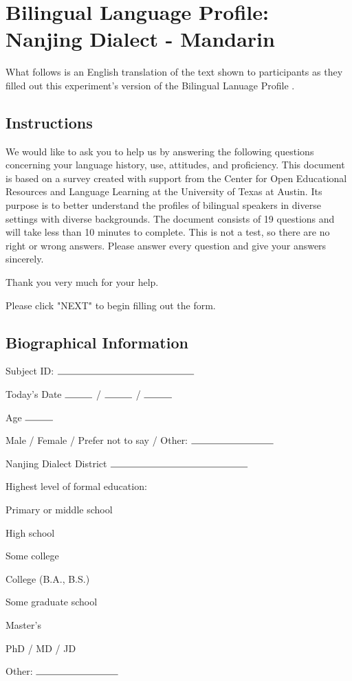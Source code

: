 \chapter{Bilingual Language Profile: Nanjing Dialect - Mandarin}	%
\label{appendix:BLP}

What follows is an English translation of the text shown to participants as they filled out this experiment's version of the Bilingual Lanuage Profile \citep{birdsong2012bilingual,gertken2014assessing}.

\section{Instructions}
	We would like to ask you to help us by answering the following questions concerning your language history, use, attitudes, and proficiency. This document is based on a survey created with support from the Center for Open Educational Resources and Language Learning at the University of Texas at Austin. Its purpose is to better understand the profiles of bilingual speakers in diverse settings with diverse backgrounds. The document consists of 19 questions and will take less than 10 minutes to complete. This is not a test, so there are no right or wrong answers. Please answer every question and give your answers sincerely.
	
	Thank you very much for your help.
	
	Please click "NEXT" to begin filling out the form.

\section{Biographical Information}
Subject ID: $\rule{5cm}{0.15mm}$

Today's Date $\rule{1cm}{0.15mm}$ / $\rule{1cm}{0.15mm}$ / $\rule{1cm}{0.15mm}$

Age $\rule{1cm}{0.15mm}$

Male / Female / Prefer not to say / Other: $\rule{3cm}{0.15mm}$

Nanjing Dialect District $\rule{5cm}{0.15mm}$

Highest level of formal education:

\indent \indent Primary or middle school

\indent \indent High school

\indent \indent Some college

\indent \indent College (B.A., B.S.)

\indent \indent Some graduate school

\indent \indent Master's

\indent \indent PhD / MD / JD

\indent \indent Other: $\rule{3cm}{0.15mm}$